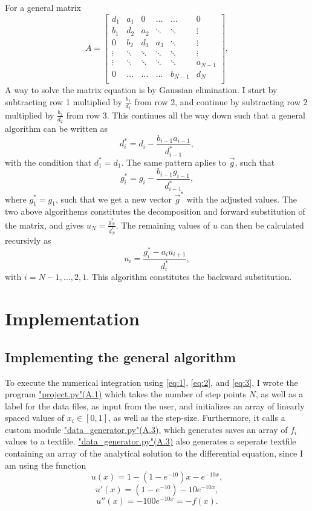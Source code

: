 \documentclass[english,notitlepage]{revtex4-1}  %
\begin{document}
For a general matrix
$$
	A =
	\begin{bmatrix}
	d_{1} & a_{1} & 0 & \dots & \dots & 0 \\
	b_{1} & d_{2} & a_{2} & \ddots & \ddots &\vdots \\
	0 & b_{2} & d_{3} & a_{3} & \ddots & \vdots \\
	\vdots & \ddots & \ddots & \ddots & \ddots & \vdots \\
	\vdots & \ddots & \ddots & \ddots & \ddots & a_{N-1} \\
	0 & \dots &\dots & \dots & b_{N-1} & d_{N} \\
	\end{bmatrix},
$$
A way to solve the matrix equation is by Gaussian elimination. I start by subtracting row 1 multiplied by \(\frac{b_{1}}{d_{1}}\) from row 2, and continue by subtracting row 2 multiplied by \(\frac{b_{2}}{d_{2}}\) from row 3. This continues all the way down such that a general algorithm can be written as
\begin{equation}
	d_{i}^{*}=d_{i}-\frac{b_{i-1}a_{i-1}}{d_{i-1}^{*}}, \label{eq:1}
\end{equation}
with the condition that \(d^{*}_{1}=d_{1}\). The same pattern aplies to \(\vec{g}\), such that
\begin{equation}
	g_{i}^{*} = g_{i}-\frac{b_{i-1}g_{i-1}}{d_{i-1}^{*}}, \label{eq:2}
\end{equation}
where \(g_{1}^{*} = g_{1}\), such that we get a new vector \(\vec{g}^{*}\) with the adjusted values. The two above algorithems constitutes the decomposition and forward substitution of the matrix, and gives \(u_{N}=\frac{g_{N}^{*}}{d_{N}^{*}}\). The remaining values of \(u\) can then be calculated recursivly as
\begin{equation}
		u_{i} = \frac{g_{i}^{*}-a_{i}u_{i+1}}{d_{i}^{*}}, \label{eq:3}
\end{equation}
with \(i = N-1,...,2,1\). This algorithm constitutes the backward substitution.

\section{Implementation}\label{sec:3}

\subsection{Implementing the general algorithm}\label{subsec:31}
To execute the numerical integration using \eqref{eq:1}, \eqref{eq:2}, and \eqref{eq:3}, I wrote the program \hyperref[A:1]{"project.py"(A.1)} which takes the number of step points \(N\), as well as a label for the data files, as input from the user, and initializes an array of linearly spaced values of \(x_{i}\in[0,1]\), as well as the step-size. Furthermore, it calls a custom module \hyperref[A:3]{"data\_generator.py"(A.3)}, which generates saves an array of \(f_{i}\) values to a textfile. \hyperref[A:3]{"data\_generator.py"(A.3)} also generates a seperate textfile containing an array of the analytical solution to the differential equation, since I am using the function
$$
	u(x) = 1-(1-e^{-10})x-e^{-10x},
$$
$$
	u'(x) = (1-e^{-10})-10e^{-10x},
$$
$$
	u''(x) = -100e^{-10x}=-f(x).
$$
\end{document}

